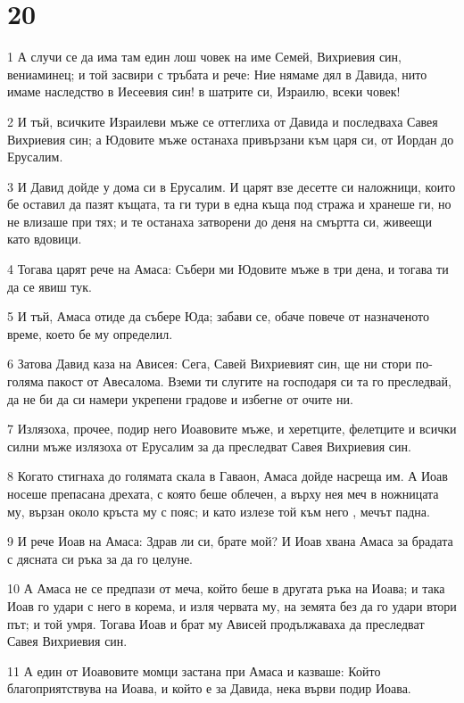 \chapter{20}

\par 1 А случи се да има там един лош човек на име Семей, Вихриевия син, вениаминец; и той засвири с тръбата и рече: Ние нямаме дял в Давида, нито имаме наследство в Иесеевия син! в шатрите си, Израилю, всеки човек!
\par 2 И тъй, всичките Израилеви мъже се оттеглиха от Давида и последваха Савея Вихриевия син; а Юдовите мъже останаха привързани към царя си, от Иордан до Ерусалим.
\par 3 И Давид дойде у дома си в Ерусалим. И царят взе десетте си наложници, които бе оставил да пазят къщата, та ги тури в една къща под стража и хранеше ги, но не влизаше при тях; и те останаха затворени до деня на смъртта си, живеещи като вдовици.
\par 4 Тогава царят рече на Амаса: Събери ми Юдовите мъже в три дена, и тогава ти да се явиш тук.
\par 5 И тъй, Амаса отиде да събере Юда; забави се, обаче повече от назначеното време, което бе му определил.
\par 6 Затова Давид каза на Ависея: Сега, Савей Вихриевият син, ще ни стори по-голяма пакост от Авесалома. Вземи ти слугите на господаря си та го преследвай, да не би да си намери укрепени градове и избегне от очите ни.
\par 7 Излязоха, прочее, подир него Иоавовите мъже, и херетците, фелетците и всички силни мъже излязоха от Ерусалим за да преследват Савея Вихриевия син.
\par 8 Когато стигнаха до голямата скала в Гаваон, Амаса дойде насреща им. А Иоав носеше препасана дрехата, с която беше облечен, а върху нея меч в ножницата му, вързан около кръста му с пояс; и като излезе той към него , мечът падна.
\par 9 И рече Иоав на Амаса: Здрав ли си, брате мой? И Иоав хвана Амаса за брадата с дясната си ръка за да го целуне.
\par 10 А Амаса не се предпази от меча, който беше в другата ръка на Иоава; и така Иоав го удари с него в корема, и изля червата му, на земята без да го удари втори път; и той умря. Тогава Иоав и брат му Ависей продължаваха да преследват Савея Вихриевия син.
\par 11 А един от Иоавовите момци застана при Амаса и казваше: Който благоприятствува на Иоава, и който е за Давида, нека върви подир Иоава.
